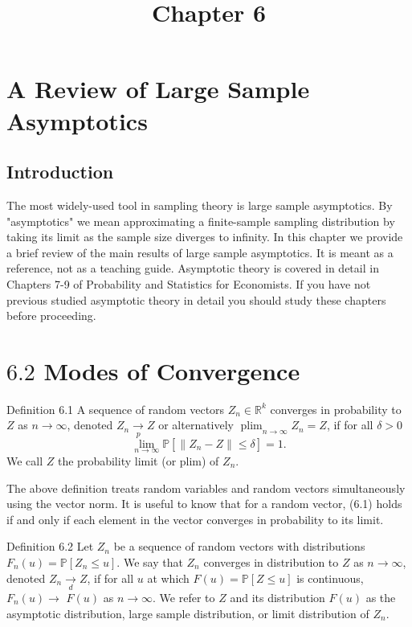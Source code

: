 \documentclass[10pt]{article}
\title{Chapter 6 }
\author{}
\date{}
\begin{document}
\maketitle
\section{A Review of Large Sample Asymptotics}
\subsection{Introduction}
The most widely-used tool in sampling theory is large sample asymptotics. By "asymptotics" we mean approximating a finite-sample sampling distribution by taking its limit as the sample size diverges to infinity. In this chapter we provide a brief review of the main results of large sample asymptotics. It is meant as a reference, not as a teaching guide. Asymptotic theory is covered in detail in Chapters 7-9 of Probability and Statistics for Economists. If you have not previous studied asymptotic theory in detail you should study these chapters before proceeding.

\section{$6.2$ Modes of Convergence}
Definition 6.1 A sequence of random vectors $Z_{n} \in \mathbb{R}^{k}$ converges in probability to $Z$ as $n \rightarrow \infty$, denoted $Z_{n} \underset{p}{\rightarrow} Z$ or alternatively $\operatorname{plim}_{n \rightarrow \infty} Z_{n}=Z$, if for all $\delta>0$
$$
\lim _{n \rightarrow \infty} \mathbb{P}\left[\left\|Z_{n}-Z\right\| \leq \delta\right]=1 .
$$
We call $Z$ the probability limit (or plim) of $Z_{n}$.

The above definition treats random variables and random vectors simultaneously using the vector norm. It is useful to know that for a random vector, (6.1) holds if and only if each element in the vector converges in probability to its limit.

Definition 6.2 Let $Z_{n}$ be a sequence of random vectors with distributions $F_{n}(u)=\mathbb{P}\left[Z_{n} \leq u\right]$. We say that $Z_{n}$ converges in distribution to $Z$ as $n \rightarrow \infty$, denoted $Z_{n} \underset{d}{\rightarrow} Z$, if for all $u$ at which $F(u)=\mathbb{P}[Z \leq u]$ is continuous, $F_{n}(u) \rightarrow$ $F(u)$ as $n \rightarrow \infty$. We refer to $Z$ and its distribution $F(u)$ as the asymptotic distribution, large sample distribution, or limit distribution of $Z_{n}$.
\end{document}
